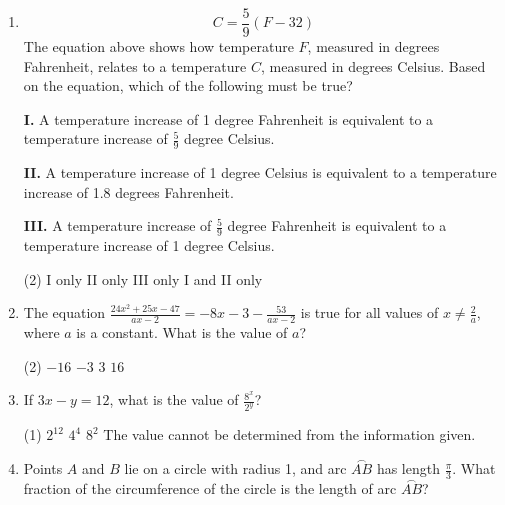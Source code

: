 \begin{enumerate}[leftmargin=*, label=\textbf{\arabic*.}]

  \item
  \[
  C = \frac{5}{9}(F - 32)
  \]
  The equation above shows how temperature $F$, measured in degrees Fahrenheit, relates to a temperature $C$, measured in degrees Celsius. Based on the equation, which of the following must be true?

  \textbf{I.} A temperature increase of 1 degree Fahrenheit is equivalent to a temperature increase of $\frac{5}{9}$ degree Celsius.

  \textbf{II.} A temperature increase of 1 degree Celsius is equivalent to a temperature increase of 1.8 degrees Fahrenheit.

  \textbf{III.} A temperature increase of $\frac{5}{9}$ degree Fahrenheit is equivalent to a temperature increase of 1 degree Celsius.

  \begin{tasks}(2)
    \task I only
    \task II only
    \task III only
    \task I and II only
  \end{tasks}
  \vspace{1cm}



  \item The equation $\displaystyle \frac{24x^2 + 25x - 47}{ax - 2} = -8x - 3 - \frac{53}{ax - 2}$ is true for all values of $x \neq \frac{2}{a}$, where $a$ is a constant. What is the value of $a$?

  \begin{tasks}(2)
    \task $-16$
    \task $-3$
    \task $3$
    \task $16$
  \end{tasks}
  \vspace{4cm}

  \item If $3x - y = 12$, what is the value of $\displaystyle \frac{8^x}{2^y}$?

  \begin{tasks}(1)
    \task $2^{12}$
    \task $4^4$
    \task $8^2$
    \task The value cannot be determined from the information given.
  \end{tasks}
  \vspace{4cm}

  \item Points $A$ and $B$ lie on a circle with radius 1, and arc $\stackrel{\frown}{AB}$ has length $\frac{\pi}{3}$. What fraction of the circumference of the circle is the length of arc $\stackrel{\frown}{AB}$?
  \vspace{4cm}


\end{enumerate}
